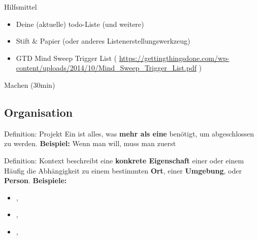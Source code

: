 \begin{frame}[c]{Hilfsmittel}
    \Large
    \begin{itemize}[<+(1)->]
        \item Deine (aktuelle) todo-Liste (und weitere)
        \item Stift \& Papier (oder anderes Listenerstellungswerkzeug)
        \item GTD Mind Sweep Trigger List \cite{trigger-list} ( \url{https://gettingthingsdone.com/wp-content/uploads/2014/10/Mind_Sweep_Trigger_List.pdf} )
    \end{itemize}
\end{frame}


\addtocounter{framenumber}{1}
\begin{frame}[standout]
    Machen (30min)
\end{frame}

\subsection{Organisation}

\begin{frame}[c]{Definition: Projekt}
    Ein  ist alles, was \textbf{mehr als eine}  benötigt, um abgeschlossen zu werden. \newline \newline \pause
    \textbf{Beispiel:} Wenn man 
    will, muss man zuerst 
\end{frame}


\begin{frame}[c]{Definition: Kontext}
     beschreibt eine \textbf{konkrete Eigenschaft} einer
     oder einem  Häufig die Abhängigkeit zu einem
    bestimmten \textbf{Ort}, einer \textbf{Umgebung}, oder \textbf{Person}.
    \newline \newline \pause
    \textbf{Beispiele:}
    \begin{itemize}[<+(1)->]
        \item {}, 
        \item {}, 
        \item {}, 
    \end{itemize}
\end{frame}


